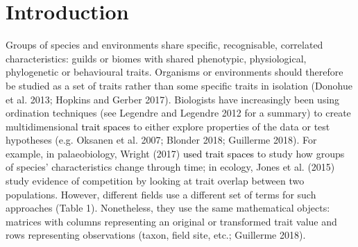 \documentclass[]{article}
\begin{document}
\section{Introduction}\label{introduction}

Groups of species and environments share specific, recognisable,
correlated characteristics: guilds or biomes with shared phenotypic,
physiological, phylogenetic or behavioural traits. Organisms or
environments should therefore be studied as a set of traits rather than
some specific traits in isolation (Donohue et al. 2013; Hopkins and
Gerber 2017). Biologists have increasingly been using ordination
techniques (see Legendre and Legendre 2012 for a summary) to create
multidimensional \textcolor{black}{trait spaces} to either
explore properties of the data or test hypotheses (e.g. Oksanen et al.
2007; Blonder 2018; Guillerme 2018). For example, in palaeobiology,
Wright (2017) \textcolor{black}{used trait spaces} to study
how groups of species' characteristics change through time; in ecology,
Jones et al. (2015) study evidence of competition by looking at trait
overlap between two populations. However, different fields use a
different set of terms for such approaches (Table 1). Nonetheless, they
use the same mathematical objects: matrices with columns representing an
original or transformed trait value and rows representing observations
(taxon, field site, etc.; Guillerme 2018).


\renewcommand\baselinestretch{1}\selectfont
\end{document}
